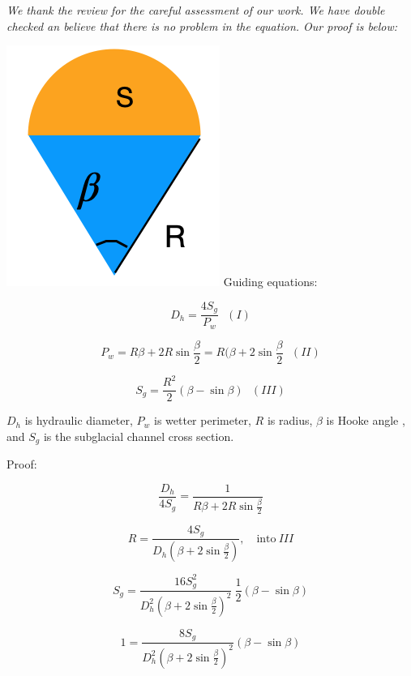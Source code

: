 \documentclass[11pt]{article}
\begin{document}
\begin{itemize}
  \textit{We thank the review for the careful assessment of our work. We have double checked an believe that there is no problem in the equation. Our proof is below:}

   \includegraphics[width=0.3\linewidth]{Hooke.png}
  Guiding equations:

  \begin{equation}
    D_h = \frac{4S_g}{P_w}~~~(I)
  \end{equation}

  \begin{equation}
    P_w = R \beta +2R \sin\frac{\beta}{2}= R(\beta +2\sin \frac{\beta}{2} ~~~(II)
  \end{equation}

  \begin{equation}
    S_g=\frac{R^2}{2}(\beta - \sin \beta)~~~(III)
  \end{equation}

  $D_h$ is hydraulic diameter, $P_w$ is wetter perimeter, $R$ is radius, $\beta$ is Hooke angle \citep{hooke1990}, and $S_g$ is the subglacial channel cross section.

  Proof:
  
  \begin{linenomath*}
    \begin{equation}
      \frac{D_h}{4S_g} = \frac{1}{R\beta + 2R\sin\frac{\beta}{2}}
    \end{equation}
  \end{linenomath*}

  \begin{equation}
    R = \frac{4S_g}{D_h (\beta +2 \sin \frac{\beta}{2})}, \quad \mathrm{into~} III 
  \end{equation}

  
  \begin{equation}
    S_g = \frac{16 S_g^2}{D_h^2 (\beta +2\sin\frac{\beta}{2})^2} ~\frac{1}{2}(\beta-\sin\beta)
  \end{equation}

  
  \begin{equation}
    1 = \frac{8 S_g}{D_h^2 (\beta +2\sin\frac{\beta}{2})^2} (\beta-\sin\beta)
  \end{equation}



\end{itemize}
\end{document}
